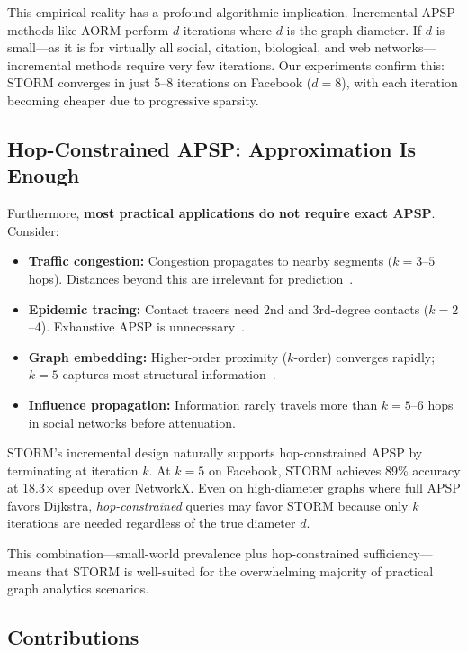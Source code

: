 \documentclass[journal]{IEEEtran}
\begin{document}
This empirical reality has a profound algorithmic implication. Incremental APSP methods like AORM perform $d$ iterations where $d$ is the graph diameter. If $d$ is small---as it is for virtually all social, citation, biological, and web networks---incremental methods require very few iterations. Our experiments confirm this: STORM converges in just 5--8 iterations on Facebook ($d=8$), with each iteration becoming cheaper due to progressive sparsity.

\subsection{Hop-Constrained APSP: Approximation Is Enough}

Furthermore, \textbf{most practical applications do not require exact APSP}. Consider:
\begin{itemize}
  \item \textbf{Traffic congestion:} Congestion propagates to nearby segments ($k=3$--$5$ hops). Distances beyond this are irrelevant for prediction~\cite{kim2020traffic}.
  \item \textbf{Epidemic tracing:} Contact tracers need 2nd and 3rd-degree contacts ($k=2$--$4$). Exhaustive APSP is unnecessary~\cite{kapoor2020covid}.
  \item \textbf{Graph embedding:} Higher-order proximity ($k$-order) converges rapidly; $k=5$ captures most structural information~\cite{zhang2018proximity}.
  \item \textbf{Influence propagation:} Information rarely travels more than $k=5$--$6$ hops in social networks before attenuation.
\end{itemize}

STORM's incremental design naturally supports hop-constrained APSP by terminating at iteration $k$. At $k=5$ on Facebook, STORM achieves 89\% accuracy at 18.3$\times$ speedup over NetworkX. Even on high-diameter graphs where full APSP favors Dijkstra, \emph{hop-constrained} queries may favor STORM because only $k$ iterations are needed regardless of the true diameter $d$.

This combination---small-world prevalence plus hop-constrained sufficiency---means that STORM is well-suited for the overwhelming majority of practical graph analytics scenarios.

\subsection{Contributions}
\end{document}
